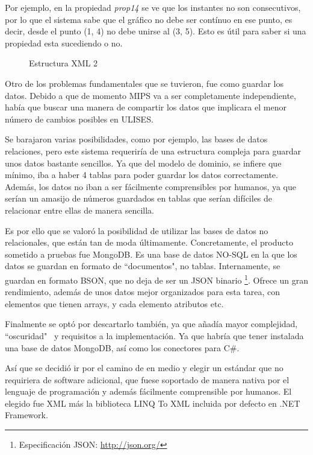 Por ejemplo, en la propiedad \emph{prop14} se ve que los instantes no son consecutivos, por lo que el sistema sabe que el 
gr\'{a}fico no debe ser cont\'inuo en ese punto, es decir, desde el punto (1, 4) no debe unirse al 
(3, 5). Esto es \'{u}til para saber si una propiedad esta sucediendo o no.

\begin{figure}[h]
    
    \caption[Estructura XML 2]{Estructura XML 2}
    \label{Estructura XML2}
\end{figure}

Otro de los problemas fundamentales que se tuvieron, fue como guardar los datos. Debido a que de momento MIPS va a ser completamente independiente, hab\'ia que buscar una manera de compartir los datos
que implicara el menor n\'umero de cambios posibles en ULISES.

Se barajaron varias posibilidades, como por ejemplo, las bases de datos relaciones, pero este sistema requerir\'ia
de una estructura compleja para guardar unos datos bastante sencillos. Ya que del modelo de dominio, se infiere que m\'inimo,
iba a haber 4 tablas para poder guardar los datos correctamente. Adem\'as, los datos no iban a ser f\'acilmente 
comprensibles por humanos, ya que ser\'ian un amasijo de n\'umeros guardados en tablas que ser\'ian dif\'iciles de
relacionar entre ellas de manera sencilla.

Es por ello que se valor\'o la posibilidad de utilizar las bases de datos no relacionales, que est\'an tan de moda
\'ultimamente. Concretamente, el producto sometido a pruebas fue MongoDB. Es una base de datos NO-SQL en la que los
datos se guardan en formato de ``documentos", no tablas. Internamente, se guardan en formato BSON, que no deja de ser
un JSON binario \footnote{Especificaci\'{o}n JSON: \url{http://json.org/}}. Ofrece un gran rendimiento, adem\'as
de unos datos mejor organizados para esta tarea, con elementos que tienen arrays, y cada elemento atributos etc.

Finalmente se opt\'o por descartarlo tambi\'en, ya que a\~nad\'ia mayor complejidad, ``oscuridad" \ y requisitos a la 
implementaci\'on. Ya que habr\'ia que tener instalada una base de datos MongoDB, as\'i como los conectores para
C\#.

As\'i que se decidi\'o ir por el camino de en medio y elegir un est\'andar que no requiriera de software adicional,
que fuese soportado de manera nativa por el lenguaje de programaci\'on y adem\'as f\'acilmente comprensible por
humanos. El elegido fue XML m\'as la biblioteca LINQ To XML incluida por defecto en .NET Framework. 

